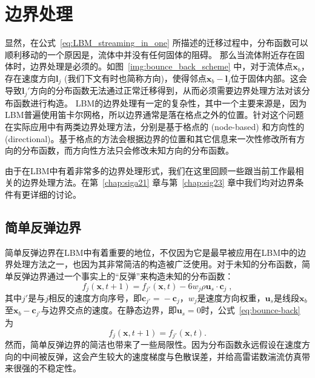 \section{边界处理}
\label{sec:boundary_treatment}
显然，在公式~\ref{eq:LBM_streaming_in_one} 所描述的迁移过程中，分布函数可以顺利移动的一个原因是，流体中并没有任何固体的阻碍。
那么当流体附近存在固体时，边界处理是必须的。如图~\ref{img:bounce_back_scheme} 中，对于流体点$\bm{x}_b$，存在速度方向$\bm{l}_j$ (我们下文有时也简称方向)，使得邻点$\bm{x}_b-\bm{l}_j$位于固体内部。这会导致$\bm{l}_j'$方向的分布函数无法通过正常迁移得到，从而必须需要边界处理方法对该分布函数进行构造。
LBM的边界处理有一定的复杂性，其中一个主要来源是，因为LBM普遍使用笛卡尔网格，所以边界通常是落在格点之外的位置。针对这个问题在实际应用中有两类边界处理方法，分别是基于格点的 (node-based) 和方向性的 (directional)。基于格点的方法会根据边界的位置和其它信息来一次性修改所有方向的分布函数，而方向性方法只会修改未知方向的分布函数。

由于在LBM中有着非常多的边界处理形式，我们在这里回顾一些跟当前工作最相关的边界处理方法。在第~\ref{chap:siga21} 章与第~\ref{chap:sig23} 章中我们均对边界条件有更详细的讨论。

\subsection{简单反弹边界}
简单反弹边界在LBM中有着重要的地位，不仅因为它是最早被应用在LBM中的边界处理方法之一，也因为其非常简洁的构造被广泛使用。对于未知的分布函数，简单反弹边界通过一个事实上的“反弹”来构造未知的分布函数：
\begin{equation}\label{eq:bounce-back}
f_{j}(\bm{x},t+1) = f_{j'}(\bm{x},t) - 6 w_{j}\rho\bm{u}_s \cdot \bm{c}_{j}\;,
\end{equation}
其中$j'$是与$j$相反的速度方向序号，即$\bm{c}_{j'}\!=\!-\bm{c}_j$，$w_j$是速度方向权重，$\bm{u}_s$是线段$\bm{x}_b$至$\bm{x}_b-\bm{c}_{j'}$与边界交点的速度。在静态边界，即$\bm{u}_s=0$时，公式~\ref{eq:bounce-back} 为
\begin{equation}
    f_{j}(\bm{x},t+1) = f_{j'}(\bm{x},t).
\end{equation}
然而，简单反弹边界的简洁也带来了一些局限性。因为分布函数永远假设在速度方向的中间被反弹，这会产生较大的速度梯度与色散误差，并给高雷诺数湍流仿真带来很强的不稳定性。

